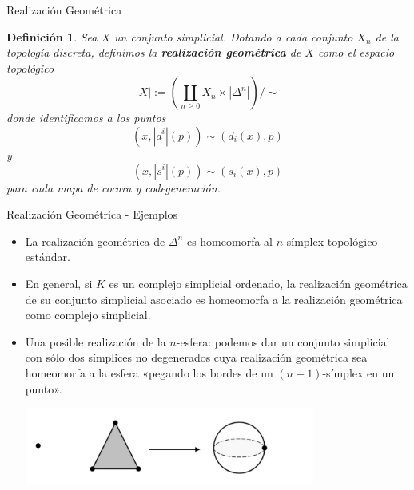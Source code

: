 \documentclass[11pt]{beamer}
\renewcommand{\ss}[1]{\Delta^{#1}}
\newcommand{\guill}[1]{«#1»}
\newtheorem{defs}{Definición}
\begin{document}
\begin{frame}{Realización Geométrica}
\begin{defs} Sea $X$ un conjunto simplicial. Dotando a cada conjunto $X_n$ de la topología discreta, definimos la \textbf{realización geométrica} de $X$ como el espacio topológico 
\[
|X| := \left(\coprod_{n \geq 0}X_n \times |\ss{n}|\right)\Big/\sim
\]
donde identificamos a los puntos \[(x,|d^i|(p)) \sim (d_i(x),p)\] y \[(x,|s^i|(p)) \sim (s_i(x),p)\] para cada mapa de cocara y codegeneración.
\end{defs}
\end{frame}

\begin{frame}{Realización Geométrica - Ejemplos}
\begin{itemize}
\item <1-> La realización geométrica de $\ss{n}$ es homeomorfa al $n$-símplex topológico estándar.
\item <2-> En general, si $K$ es un complejo simplicial ordenado, la realización geométrica de su conjunto simplicial asociado es homeomorfa a la realización geométrica como complejo simplicial.
\item <3-> Una posible realización de la $n$-esfera: podemos dar un conjunto simplicial con sólo dos símplices no degenerados cuya realización geométrica sea homeomorfa a la esfera \guill{pegando los bordes de un $(n-1)$-símplex en un punto}.
\begin{center}
\begin{overprint}
\begin{center}
\includegraphics[width=0.75\textwidth]{modelo-simpl-nesfera.png}
\end{center}
\end{overprint}
\end{center}
\end{itemize}
\end{frame}
\end{document}
